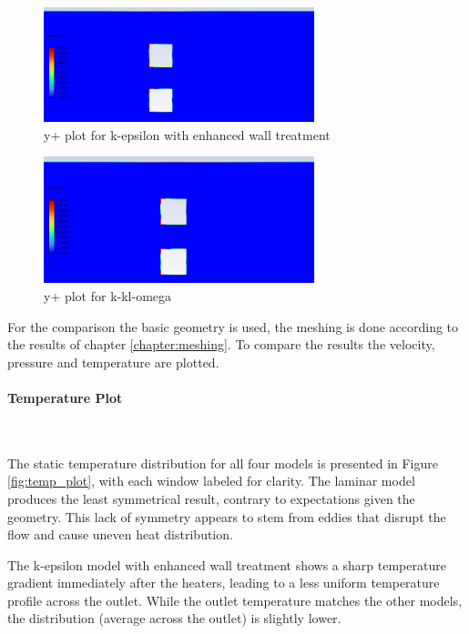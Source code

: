 \begin{figure}[h]   
    \centering
    \includegraphics[width=0.7\textwidth]{img/y_plus_k_epsilon_enhanced_wt.png}
    \caption{y+ plot for k-epsilon with enhanced wall treatment}
    \label{fig:k_epsilon_enhanced_y_plus}
\end{figure}

\begin{figure}[h]   
    \centering
    \includegraphics[width=0.7\textwidth]{img/y_plus_k_kl_omega_detail_inf5.png}
    \caption{y+ plot for k-kl-omega}
    \label{fig:k_kl_omega_y_plus}
\end{figure}

\clearpage

For the comparison the basic geometry is used, the meshing is done according to the results of chapter \ref{chapter:meshing}.
To compare the results the velocity, pressure and temperature are plotted.

\paragraph{Temperature Plot}~

The static temperature distribution for all four models is presented in Figure \ref{fig:temp_plot}, with each window labeled for clarity. The laminar model produces the least symmetrical result, contrary to expectations given the geometry. This lack of symmetry appears to stem from eddies that disrupt the flow and cause uneven heat distribution.

The k-epsilon model with enhanced wall treatment shows a sharp temperature gradient immediately after the heaters, leading to a less uniform temperature profile across the outlet. While the outlet temperature matches the other models, the distribution (average across the outlet) is slightly lower.

